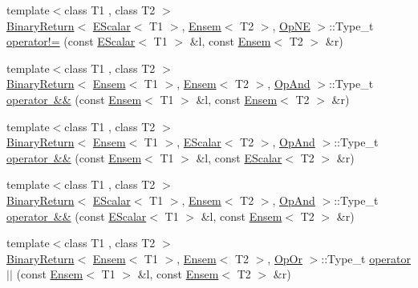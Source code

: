 \begin{DoxyCompactItemize}
\item 
{\footnotesize template$<$class T1 , class T2 $>$ }\\\mbox{\hyperlink{structENSEM_1_1BinaryReturn}{Binary\+Return}}$<$ \mbox{\hyperlink{classENSEM_1_1EScalar}{E\+Scalar}}$<$ T1 $>$, \mbox{\hyperlink{classENSEM_1_1Ensem}{Ensem}}$<$ T2 $>$, \mbox{\hyperlink{structENSEM_1_1OpNE}{Op\+NE}} $>$\+::Type\+\_\+t \mbox{\hyperlink{group__eensem_ga312278f2450b3a4afdfd443566c93d0a}{operator!=}} (const \mbox{\hyperlink{classENSEM_1_1EScalar}{E\+Scalar}}$<$ T1 $>$ \&l, const \mbox{\hyperlink{classENSEM_1_1Ensem}{Ensem}}$<$ T2 $>$ \&r)
\item 
{\footnotesize template$<$class T1 , class T2 $>$ }\\\mbox{\hyperlink{structENSEM_1_1BinaryReturn}{Binary\+Return}}$<$ \mbox{\hyperlink{classENSEM_1_1Ensem}{Ensem}}$<$ T1 $>$, \mbox{\hyperlink{classENSEM_1_1Ensem}{Ensem}}$<$ T2 $>$, \mbox{\hyperlink{structENSEM_1_1OpAnd}{Op\+And}} $>$\+::Type\+\_\+t \mbox{\hyperlink{group__eensem_ga1a9761f53df3f59110335a2a8cf2d67c}{operator \&\&}} (const \mbox{\hyperlink{classENSEM_1_1Ensem}{Ensem}}$<$ T1 $>$ \&l, const \mbox{\hyperlink{classENSEM_1_1Ensem}{Ensem}}$<$ T2 $>$ \&r)
\item 
{\footnotesize template$<$class T1 , class T2 $>$ }\\\mbox{\hyperlink{structENSEM_1_1BinaryReturn}{Binary\+Return}}$<$ \mbox{\hyperlink{classENSEM_1_1Ensem}{Ensem}}$<$ T1 $>$, \mbox{\hyperlink{classENSEM_1_1EScalar}{E\+Scalar}}$<$ T2 $>$, \mbox{\hyperlink{structENSEM_1_1OpAnd}{Op\+And}} $>$\+::Type\+\_\+t \mbox{\hyperlink{group__eensem_ga00415a6169d18f80656be828f11a157b}{operator \&\&}} (const \mbox{\hyperlink{classENSEM_1_1Ensem}{Ensem}}$<$ T1 $>$ \&l, const \mbox{\hyperlink{classENSEM_1_1EScalar}{E\+Scalar}}$<$ T2 $>$ \&r)
\item 
{\footnotesize template$<$class T1 , class T2 $>$ }\\\mbox{\hyperlink{structENSEM_1_1BinaryReturn}{Binary\+Return}}$<$ \mbox{\hyperlink{classENSEM_1_1EScalar}{E\+Scalar}}$<$ T1 $>$, \mbox{\hyperlink{classENSEM_1_1Ensem}{Ensem}}$<$ T2 $>$, \mbox{\hyperlink{structENSEM_1_1OpAnd}{Op\+And}} $>$\+::Type\+\_\+t \mbox{\hyperlink{group__eensem_ga327bfc24e647dfce0a0b0373f4e72084}{operator \&\&}} (const \mbox{\hyperlink{classENSEM_1_1EScalar}{E\+Scalar}}$<$ T1 $>$ \&l, const \mbox{\hyperlink{classENSEM_1_1Ensem}{Ensem}}$<$ T2 $>$ \&r)
\item 
{\footnotesize template$<$class T1 , class T2 $>$ }\\\mbox{\hyperlink{structENSEM_1_1BinaryReturn}{Binary\+Return}}$<$ \mbox{\hyperlink{classENSEM_1_1Ensem}{Ensem}}$<$ T1 $>$, \mbox{\hyperlink{classENSEM_1_1Ensem}{Ensem}}$<$ T2 $>$, \mbox{\hyperlink{structENSEM_1_1OpOr}{Op\+Or}} $>$\+::Type\+\_\+t \mbox{\hyperlink{group__eensem_ga5e2d1d875f2929ebe89f76b2d73b0a34}{operator$\vert$$\vert$}} (const \mbox{\hyperlink{classENSEM_1_1Ensem}{Ensem}}$<$ T1 $>$ \&l, const \mbox{\hyperlink{classENSEM_1_1Ensem}{Ensem}}$<$ T2 $>$ \&r)

\end{DoxyCompactItemize}

